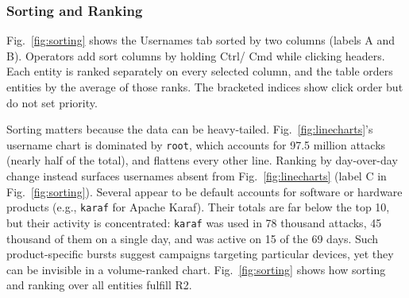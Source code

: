 \documentclass[conference]{IEEEtran}
\newcommand{\uname}[1]{\texttt{#1}}   %
\newcommand{\ui}[1]{{\sffamily\hyphenchar\font=-1 #1}}
\begin{document}
\subsubsection{Sorting and Ranking}
\label{sec:sorting}

Fig.~\ref{fig:sorting} shows the \ui{Usernames} tab sorted by two columns (labels A and B). Operators add sort columns by holding \ui{Ctrl}/\ui{Cmd} while clicking headers. Each entity is ranked
separately on every selected column, and the table orders entities by the average of those ranks. The bracketed indices show click order but do not set priority.


Sorting matters because the data can be heavy-tailed. Fig.~\ref{fig:linecharts}'s username chart is dominated by \uname{root},
which accounts for 97.5 million attacks (nearly half of the total), and flattens every other line. Ranking by day-over-day change instead surfaces usernames absent from 
Fig.~\ref{fig:linecharts} (label C in Fig.~\ref{fig:sorting}). Several appear to be
default accounts for software or hardware products (e.g., \uname{karaf} for
Apache Karaf). Their totals are far below the top 10, but their activity is concentrated: \uname{karaf} was used in 78 thousand attacks,
45 thousand of them on a single day, and was active on 15 of the 69 days. Such product-specific bursts suggest campaigns targeting particular
devices, yet they can be invisible in a volume-ranked chart. Fig.~\ref{fig:sorting} shows how sorting and ranking over all entities fulfill R2.

\end{document}
